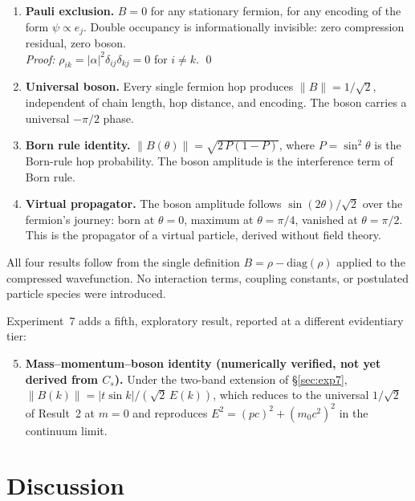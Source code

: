 \documentclass[11pt]{article}
\begin{document}
\begin{enumerate}
  \item \textbf{Pauli exclusion.}
        $B = 0$ for any stationary fermion, for any encoding of the form
        $\psi \propto e_j$.
        Double occupancy is informationally invisible: zero compression
        residual, zero boson. \\
        \emph{Proof:} $\rho_{ik} = |\alpha|^2\delta_{ij}\delta_{kj} = 0$
        for $i \neq k$. \qed

  \item \textbf{Universal boson.}
        Every single fermion hop produces $\|B\| = 1/\sqrt{2}$, independent
        of chain length, hop distance, and encoding.
        The boson carries a universal $-\pi/2$ phase.

  \item \textbf{Born rule identity.}
        $\|B(\theta)\| = \sqrt{2\,P(1-P)}$, where $P = \sin^2\theta$ is the
        Born-rule hop probability.
        The boson amplitude is the interference term of Born rule.

  \item \textbf{Virtual propagator.}
        The boson amplitude follows $\sin(2\theta)/\sqrt{2}$ over the fermion's
        journey: born at $\theta = 0$, maximum at $\theta = \pi/4$, vanished at
        $\theta = \pi/2$.
        This is the propagator of a virtual particle, derived without field theory.
\end{enumerate}

All four results follow from the single definition $B = \rho - \mathrm{diag}(\rho)$
applied to the compressed wavefunction.
No interaction terms, coupling constants, or postulated particle species were
introduced.

Experiment~7 adds a fifth, exploratory result, reported at a different
evidentiary tier:

\begin{enumerate}
  \setcounter{enumi}{4}
  \item \textbf{Mass--momentum--boson identity (numerically verified,
        not yet derived from $C_s$).}
        Under the two-band extension of \S\ref{sec:exp7},
        $\|B(k)\| = |t\sin k|/(\sqrt{2}\,E(k))$, which reduces to the
        universal $1/\sqrt{2}$ of Result~2 at $m=0$ and reproduces
        $E^2 = (pc)^2+(m_0c^2)^2$ in the continuum limit.
\end{enumerate}

\section{Discussion}
\label{sec:discussion}
\end{document}
